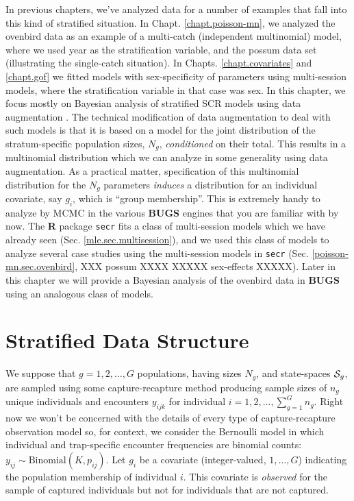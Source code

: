 In previous chapters, we've analyzed data for a number of examples
that fall into this kind of stratified situation. In
Chapt. \ref{chapt.poisson-mn}, we analyzed the ovenbird data as an
example of a multi-catch (independent multinomial) model, where we
used year as the stratification variable, and the possum data set
(illustrating the single-catch situation). In
Chapts. \ref{chapt.covariates} and \ref{chapt.gof} we fitted models
with sex-specificity of parameters using multi-session models, where
the stratification variable in that case was sex.  In this chapter, we
focus mostly on Bayesian analysis of stratified SCR models using data
augmentation \citep{royle_etal:2012arXiv,royle_converse:2013}.  The
technical modification of data augmentation to deal with such models
is that it is based on a model for the joint distribution of the
stratum-specific population sizes, $N_{g}$, {\it conditioned} on their
total. This results in a multinomial distribution which we can analyze
in some generality using data augmentation.  As a practical matter,
specification of this multinomial distribution for the $N_{g}$
parameters {\it induces} a distribution for an individual covariate,
say $g_{i}$, which is ``group membership''.  This is extremely handy
to analyze by MCMC in the various {\bf BUGS} engines that you are
familiar with by now.  The {\bf R} package \mbox{\tt secr} fits a
class of multi-session models which we have already seen
(Sec. \ref{mle.sec.multisession}), and we used this class of models to
analyze several case studies using the multi-session models in
\mbox{\tt secr} (Sec. \ref{poisson-mn.sec.ovenbird}, XXX possum XXXX
XXXXX sex-effects XXXXX). Later in this chapter we will provide a
Bayesian analysis of the ovenbird data in {\bf BUGS} using an
analogous class of models.



\section{Stratified Data Structure}


We suppose that $g=1,2,\ldots,G$ populations, having sizes $N_{g}$,
and state-spaces ${\cal S}_{g}$, are sampled using some capture-recapture
method producing sample sizes of $n_{g}$ unique individuals and
encounters $y_{ijk}$ for individual $i=1,2,\ldots, \sum_{g=1}^{G}
n_{g}$.  Right now we won't be concerned with the details of every
type of capture-recapture observation model so, for context, we
consider the Bernoulli model in which individual and trap-specific
encounter frequencies are binomial counts: $y_{ij} \sim
\mbox{Binomial}(K,p_{ij})$.  Let $g_{i}$ be a covariate
(integer-valued, $1, \ldots, G$) indicating the population membership
of individual $i$. This covariate is {\it observed} for the sample of
captured individuals but not for individuals that are not captured.

